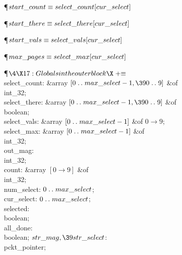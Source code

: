\Y\P\D {}$\\{start\_count}\S\\{select\_count}[\\{cur\_select}]$\par
\P\D {}$\\{start\_there}\S\\{select\_there}[\\{cur\_select}]$\par
\P\D {}$\\{start\_vals}\S\\{select\_vals}[\\{cur\_select}]$\par
\P\D {}$\\{max\_pages}\S\\{select\_max}[\\{cur\_select}]$\par
\Y\P$\4\X17:Globals in the outer block\X\mathrel{+}\S$\6
\4\\{select\_count}: \&{array} $[0\to\\{max\_select}-1,\390\to9]$ \1\&{of}\5
\\{int\_32};\2\6
\4\\{select\_there}: \&{array} $[0\to\\{max\_select}-1,\390\to9]$ \1\&{of}\5
\\{boolean};\2\6
\4\\{select\_vals}: \&{array} $[0\to\\{max\_select}-1]$ \1\&{of}\5
$0\to9$;\2\6
\4\\{select\_max}: \&{array} $[0\to\\{max\_select}-1]$ \1\&{of}\5
\\{int\_32};\2\6
\4\\{out\_mag}: \\{int\_32};\6
\4\\{count}: \&{array} $[0\to9]$ \1\&{of}\5
\\{int\_32};\2\6
\4\\{num\_select}: $0\to\\{max\_select}$;\6
\4\\{cur\_select}: $0\to\\{max\_select}$;\6
\4\\{selected}: \\{boolean};\6
\4\\{all\_done}: \\{boolean};\6
\4$\\{str\_mag},\39\\{str\_select}$: \\{pckt\_pointer};\par
\fi

